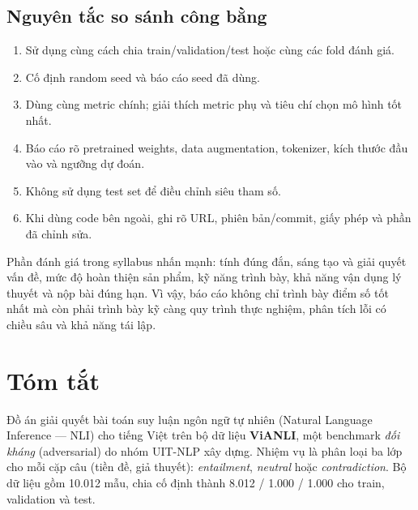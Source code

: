 \documentclass[12pt,a4paper,oneside]{report}
\begin{document}
\section*{Nguyên tắc so sánh công bằng}
\begin{enumerate}[leftmargin=*,itemsep=3pt]
  \item Sử dụng cùng cách chia train/validation/test hoặc cùng các fold đánh giá.
  \item Cố định random seed và báo cáo seed đã dùng.
  \item Dùng cùng metric chính; giải thích metric phụ và tiêu chí chọn mô hình tốt nhất.
  \item Báo cáo rõ pretrained weights, data augmentation, tokenizer, kích thước đầu vào và ngưỡng dự đoán.
  \item Không sử dụng test set để điều chỉnh siêu tham số.
  \item Khi dùng code bên ngoài, ghi rõ URL, phiên bản/commit, giấy phép và phần đã chỉnh sửa.
\end{enumerate}

\begin{notebox}
Phần đánh giá trong syllabus nhấn mạnh: tính đúng đắn, sáng tạo và giải quyết vấn đề, mức độ hoàn thiện sản phẩm, kỹ năng trình bày, khả năng vận dụng lý thuyết và nộp bài đúng hạn.
Vì vậy, báo cáo không chỉ trình bày điểm số tốt nhất mà còn phải trình bày kỹ càng quy trình thực nghiệm, phân tích lỗi có chiều sâu và khả năng tái lập.
\end{notebox}

\clearpage
\tableofcontents
\clearpage
\listoffigures
{}
\clearpage
\listoftables
{}
\clearpage

\setcounter{page}{1}

\chapter{Tóm tắt}

Đồ án giải quyết bài toán suy luận ngôn ngữ tự nhiên (Natural Language Inference --- NLI)
cho tiếng Việt trên bộ dữ liệu \textbf{ViANLI}, một benchmark \textit{đối kháng}
(adversarial) do nhóm UIT-NLP xây dựng. Nhiệm vụ là phân loại ba lớp cho mỗi cặp câu
(tiền đề, giả thuyết): \textit{entailment}, \textit{neutral} hoặc \textit{contradiction}.
Bộ dữ liệu gồm 10.012 mẫu, chia cố định thành 8.012 / 1.000 / 1.000 cho train, validation
và test.
\end{document}
